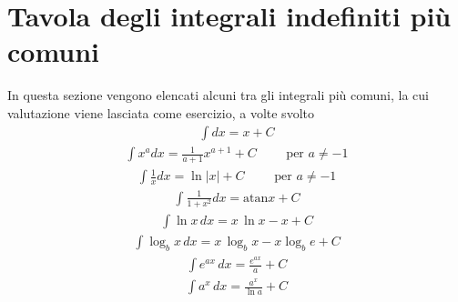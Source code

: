 \documentclass[letterpaper,10pt,italian]{jupyterBook}
\begin{document}
\section{Tavola degli integrali indefiniti più comuni}
\label{\detokenize{ch/infinitesimal_calculus/integrals-table:tavola-degli-integrali-indefiniti-piu-comuni}}\label{\detokenize{ch/infinitesimal_calculus/integrals-table:infinitesimal-calculus-integrals-table}}\label{\detokenize{ch/infinitesimal_calculus/integrals-table::doc}}
\sphinxAtStartPar
In questa sezione vengono elencati alcuni tra gli integrali più comuni, la cui valutazione viene lasciata come esercizio, a volte svolto
\begin{equation*}
\begin{split}\int dx             = x + C\end{split}
\end{equation*}\begin{equation*}
\begin{split}\int x^a dx         = \frac{1}{a+1} x^{a+1} + C  \qquad \text{ per } a \ne -1\end{split}
\end{equation*}\begin{equation*}
\begin{split}\int \frac{1}{x} dx = \ln |x| + C  \qquad \text{ per } a \ne -1\end{split}
\end{equation*}\begin{equation*}
\begin{split}\int \frac{1}{1+x^2} dx = \text{atan} x + C\end{split}
\end{equation*}\begin{equation*}
\begin{split}\int \ln x \, dx    = x \, \ln x - x + C\end{split}
\end{equation*}\begin{equation*}
\begin{split}\int \log_b x \, dx    = x \, \log_b x - x \log_b e + C\end{split}
\end{equation*}\begin{equation*}
\begin{split}\int e^{a x} \, dx  = \frac{e^{ax}}{a} + C\end{split}
\end{equation*}\begin{equation*}
\begin{split}\int a^x \, dx  = \frac{a^x}{\ln a} + C\end{split}

\end{equation*}
\end{document}
